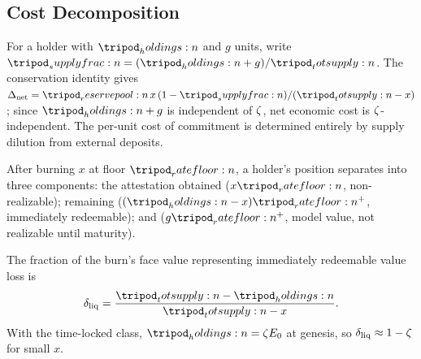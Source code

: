 \documentclass[../main.tex]{subfiles}
\begin{document}
\subsection{Cost Decomposition}
\label{sec:costliness:decomposition}

\begin{theorem}
    \label{thm:costliness:zeta-independence}
    For a holder with $\holdings{}$ \liveclass{} and $g$ \tlockclass{} units, write
    $\supplyfrac{} = (\holdings{}+g)/\totsupply{}$. The conservation identity gives
    $\netcost = \reservepool{}\,x\,(1-\supplyfrac{})/(\totsupply{}-x)$; since
    $\holdings{}+g$ is independent of $\zeta$, net economic cost is
    $\zeta$-independent. The per-unit cost of commitment is determined entirely by
    supply dilution from external deposits.
\end{theorem}

\begin{definition}
    \label{def:costliness:position-decomposition}
    After burning $x$ at floor $\ratefloor{}$, a holder's position separates into three
    components: the attestation obtained ($x\ratefloor{}$, non-realizable); remaining
    \liveclass{} ($(\holdings{}-x)\ratefloor{}^{+}$, immediately redeemable); and
    \tlockclass{} ($g\ratefloor{}^{+}$, model value, not realizable until maturity).
\end{definition}

\begin{definition}
    \label{def:costliness:redeemable-cost-ratio}
    The fraction of the burn's face value representing immediately redeemable value loss is
    \begin{equation}
        \redeemratio = \frac{\totsupply{} - \holdings{}}{\totsupply{} - x}.
        \label{eq:costliness:redeemable-cost-ratio}
    \end{equation}
    With the time-locked class, $\holdings{} = \livesplit\genesisreserve$ at genesis, so
    $\delta\sb{\mathrm{liq}} \approx 1 - \zeta$ for small $x$.
\end{definition}
\end{document}

